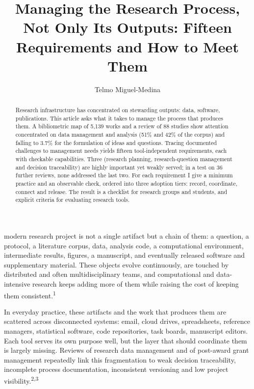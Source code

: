 \documentclass{IEEEcsmag}
\begin{document}

\title{Managing the Research Process, Not Only Its Outputs: Fifteen Requirements and How to Meet Them}

\author{Telmo Miguel-Medina}


\begin{abstract}
Research infrastructure has concentrated on stewarding outputs: data, software, publications. This article asks what it takes to manage the process that produces them. A bibliometric map of 5{,}139 works and a review of 88 studies show attention concentrated on data management and analysis (51\% and 42\% of the corpus) and falling to 3.7\% for the formulation of ideas and questions. Tracing documented challenges to management needs yields fifteen tool-independent requirements, each with checkable capabilities. Three (research planning, research-question management and decision traceability) are highly important yet weakly served; in a test on 36 further reviews, none addressed the last two. For each requirement I give a minimum practice and an observable check, ordered into three adoption tiers: record, coordinate, connect and release. The result is a checklist for research groups and students, and explicit criteria for evaluating research tools.
\end{abstract}

\maketitle

 modern research project is not a single artifact but a chain of them: a question, a protocol, a literature corpus, data, analysis code, a computational environment, intermediate results, figures, a manuscript, and eventually released software and supplementary material. These objects evolve continuously, are touched by distributed and often multidisciplinary teams, and computational and data-intensive research keeps adding more of them while raising the cost of keeping them consistent.\textsuperscript{1}

In everyday practice, these artifacts and the work that produces them are scattered across disconnected systems: email, cloud drives, spreadsheets, reference managers, statistical software, code repositories, task boards, manuscript editors. Each tool serves its own purpose well, but the layer that should coordinate them is largely missing. Reviews of research data management and of post-award grant management repeatedly link this fragmentation to weak decision traceability, incomplete process documentation, inconsistent versioning and low project visibility.\textsuperscript{2,3}
\end{document}
